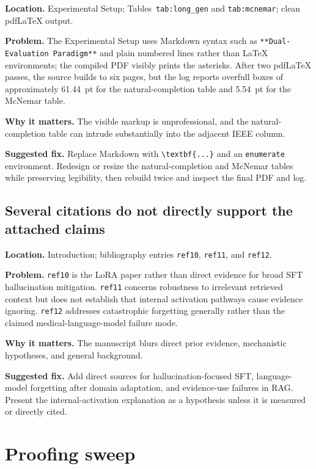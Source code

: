 \documentclass[11pt]{article}
\newcommand{\findinglabel}[1]{\textbf{#1}}
\begin{document}
\findinglabel{Location.} Experimental Setup; Tables~\texttt{tab:long\_gen} and \texttt{tab:mcnemar}; clean pdfLaTeX output.

\findinglabel{Problem.} The Experimental Setup uses Markdown syntax such as \verb|**Dual-Evaluation Paradigm**| and plain numbered lines rather than LaTeX environments; the compiled PDF visibly prints the asterisks.  After two pdfLaTeX passes, the source builds to six pages, but the log reports overfull boxes of approximately 61.44~pt for the natural-completion table and 5.54~pt for the McNemar table.

\findinglabel{Why it matters.} The visible markup is unprofessional, and the natural-completion table can intrude substantially into the adjacent IEEE column.

\findinglabel{Suggested fix.} Replace Markdown with \verb|\textbf{...}| and an \texttt{enumerate} environment.  Redesign or resize the natural-completion and McNemar tables while preserving legibility, then rebuild twice and inspect the final PDF and log.

\subsection*{Several citations do not directly support the attached claims}

\findinglabel{Location.} Introduction; bibliography entries \texttt{ref10}, \texttt{ref11}, and \texttt{ref12}.

\findinglabel{Problem.} \texttt{ref10} is the LoRA paper rather than direct evidence for broad SFT hallucination mitigation.  \texttt{ref11} concerns robustness to irrelevant retrieved context but does not establish that internal activation pathways cause evidence ignoring.  \texttt{ref12} addresses catastrophic forgetting generally rather than the claimed medical-language-model failure mode.

\findinglabel{Why it matters.} The manuscript blurs direct prior evidence, mechanistic hypotheses, and general background.

\findinglabel{Suggested fix.} Add direct sources for hallucination-focused SFT, language-model forgetting after domain adaptation, and evidence-use failures in RAG.  Present the internal-activation explanation as a hypothesis unless it is measured or directly cited.

\section*{Proofing sweep}
\end{document}
